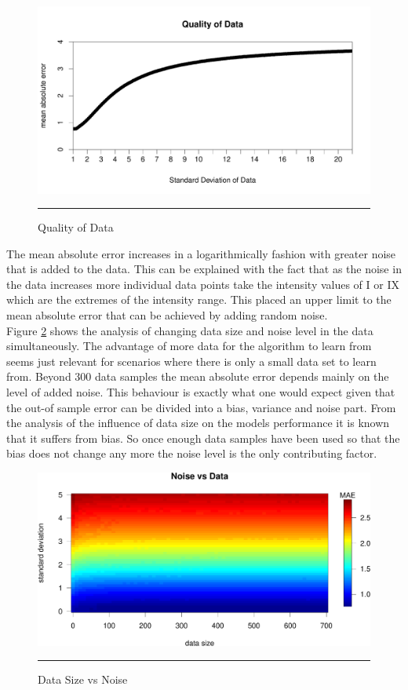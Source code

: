 \begin{figure}[!htb]
	\centering
		\includegraphics[scale=0.335]{Figures/noise.pdf}
		\rule{35em}{0.5pt}
	\caption[Quality of Data]{Quality of Data}
	\label{fig:noise}
\end{figure}



The mean absolute error increases in a logarithmically fashion with greater noise that is added to the data. This can be explained with the fact that as the noise in the data increases more individual data points take the intensity values of I or IX which are the extremes of the intensity range. This placed an upper limit to the mean absolute error that can be achieved by adding random noise. \\
  
Figure \ref{fig:noiseData} shows the analysis of changing data size and noise level in the data simultaneously. The advantage of more data for the algorithm to learn from seems just relevant for scenarios where there is only a small data set to learn from. Beyond 300 data samples the mean absolute error depends mainly on the level of added noise. This behaviour is exactly what one would expect given that the out-of sample error can be divided into a bias, variance and noise part\citep{LearningFromData}. From the analysis of the influence of data size on the models performance it is known that it suffers from bias. So once enough data samples have been used so that the bias does not change any more the noise level is the only contributing factor.

\begin{figure}[!htpb]
	\centering
		\includegraphics[scale=0.33]{Figures/numberDataNoise.pdf}
		\rule{35em}{0.5pt}
	\caption[Data Size vs Noise]{Data Size vs Noise}
	\label{fig:noiseData}
\end{figure}
